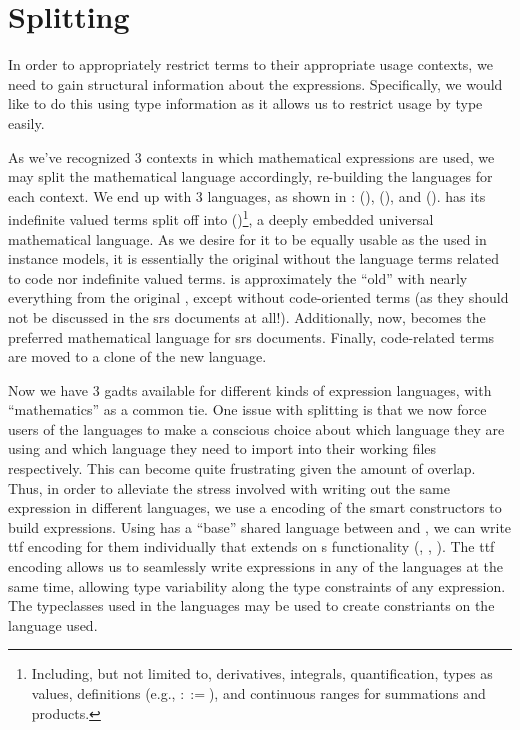 \section{Splitting}
\label{chap:lang-division:sec:splitting}

In order to appropriately restrict terms to their appropriate usage contexts, we
need to gain structural information about the expressions. Specifically, we
would like to do this using type information as it allows us to restrict usage
by type easily.

\languageDivision{}

As we've recognized 3 contexts in which mathematical expressions are used, we
may split the mathematical language accordingly, re-building the languages for
each context. We end up with 3 languages, as shown in :
\Expr{} (), \ModelExpr{}
(), and \CodeExpr{} ().
\Expr{} has its indefinite valued terms split off into \ModelExpr{}
()\footnote{Including, but not limited to,
derivatives, integrals, quantification, types as values, definitions (e.g.,
\(::=\)), and continuous ranges for summations and products.}, a deeply embedded
universal mathematical language. As we desire for it to be equally usable as the
\Expr{} used in instance models, it is essentially the original \Expr{} without
the language terms related to code nor indefinite valued terms. \ModelExpr{} is
approximately the ``old'' \Expr{} with nearly everything from the original
\Expr{}, except without code-oriented terms (as they should not be discussed in
the \acs{srs} documents at all!). Additionally, now, \ModelExpr{} becomes the
preferred mathematical language for \acs{srs} documents. Finally, code-related
terms are moved to a clone of the new \Expr{} language.

Now we have 3 \acsp{gadt} available for different kinds of expression
languages, with ``mathematics'' as a common tie. One issue with splitting is
that we now force users of the languages to make a conscious choice about which
language they are using and which language they need to import into their
working files respectively. This can become quite frustrating given the amount
of overlap. Thus, in order to alleviate the stress involved with writing out the
same expression in different languages, we use a  encoding of the smart
constructors to build expressions. Using \Expr{} has a ``base'' shared language
between \ModelExpr{} and \CodeExpr{}, we can write \acs{ttf} encoding for them
individually that extends on \Expr{}s functionality
(, ,
). The \acs{ttf} encoding allows us to seamlessly
write expressions in any of the languages at the same time, allowing type
variability along the type constraints of any expression. The typeclasses used
in the languages may be used to create constriants on the language used.

